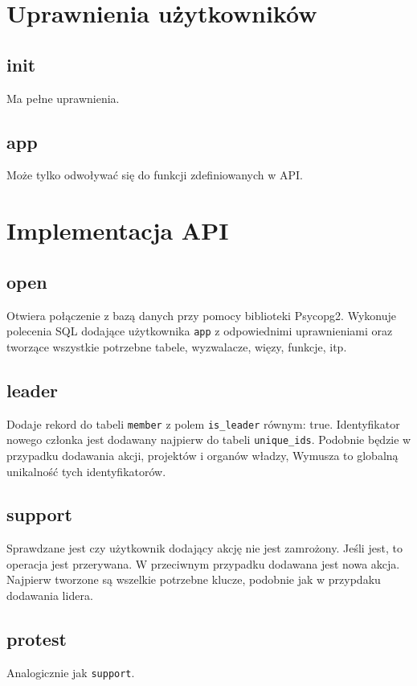 \documentclass[polish,11pt,a4paper]{article}
\begin{document}
\section{Uprawnienia użytkowników}
    \subsection{init}
        Ma pełne uprawnienia.
    \subsection{app}
        Może tylko odwoływać się do funkcji zdefiniowanych w API.

\section{Implementacja API}

    \subsection{open}
        Otwiera połączenie z bazą danych przy pomocy biblioteki Psycopg2. Wykonuje polecenia SQL dodające użytkownika \texttt{app} z odpowiednimi uprawnieniami oraz tworzące wszystkie potrzebne tabele, wyzwalacze, więzy, funkcje, itp.

    \subsection{leader}
        Dodaje rekord do tabeli \texttt{member} z polem \texttt{is\_leader} równym: true. Identyfikator nowego członka jest dodawany najpierw do tabeli \texttt{unique\_ids}. Podobnie będzie w przypadku dodawania akcji, projektów i organów władzy, Wymusza to globalną unikalność tych identyfikatorów.

    \subsection{support}
        Sprawdzane jest czy użytkownik dodający akcję nie jest zamrożony. Jeśli jest, to operacja jest przerywana. W przeciwnym przypadku dodawana jest nowa akcja. Najpierw tworzone są wszelkie potrzebne klucze, podobnie jak w przypdaku dodawania lidera. 
    \subsection{protest}
        Analogicznie jak \texttt{support}.
\end{document}
